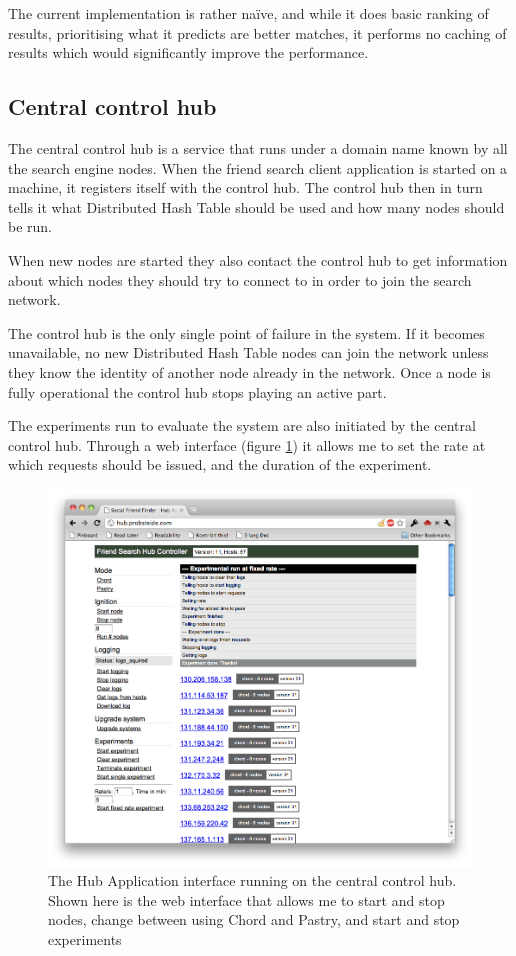 The current implementation is rather na\"ive, and while it does basic ranking of results, prioritising what it predicts are better matches, it performs no caching of results which would significantly improve the performance.

\subsection{Central control hub}
The central control hub is a service that runs under a domain name known by all the search engine nodes.
When the friend search client application is started on a machine, it registers itself with the control hub. The control hub then in turn tells it what Distributed Hash Table should be used and how many nodes should be run.

When new nodes are started they also contact the control hub to get information about which nodes they should try to connect to in order to join the search network.

The control hub is the only single point of failure in the system. If it becomes unavailable, no new Distributed Hash Table nodes can join the network unless they know the identity of another node already in the network. Once a node is fully operational the control hub stops playing an active part.

The experiments run to evaluate the system are also initiated by the central control hub.
Through a web interface (figure \ref{figHubApp}) it allows me to set the rate at which requests should be issued, and the duration of the experiment.

\begin{figure}[!htb]
\begin{center}
	\includegraphics[width=0.9\linewidth]{illustrations/HubApp.png}
\caption{The Hub Application interface running on the central control hub. Shown here is the web interface that allows me to start and stop nodes, change between using Chord and Pastry, and start and stop experiments}
\label{figHubApp}
\end{center}
\end{figure}

